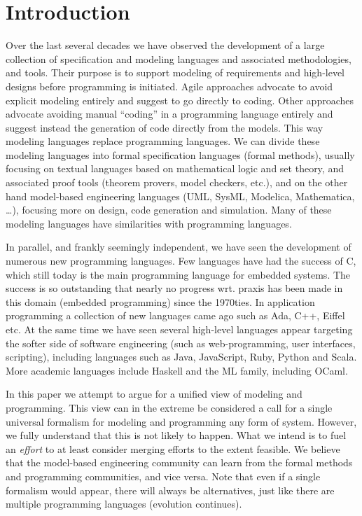 
\section{Introduction}

Over the last several decades we have observed the development of a 
large collection of specification and modeling languages and 
associated methodologies, and tools. Their purpose is to 
support modeling of requirements and high-level designs before 
programming is initiated. Agile approaches advocate to avoid 
explicit modeling entirely and suggest to go directly to coding. 
Other approaches advocate avoiding manual “coding” in a programming 
language entirely and suggest instead the generation of code 
directly from the models. This way modeling languages replace 
programming languages.  We can divide these modeling languages into 
formal specification languages (formal methods), usually focusing 
on textual languages based on mathematical logic and set theory, 
and associated proof tools (theorem provers, model checkers, etc.), 
and on the other hand model-based engineering languages (UML, 
SysML, Modelica, Mathematica, …), focusing more on design, code 
generation and simulation. Many of these modeling languages have 
similarities with programming languages.

In parallel, and frankly seemingly independent, we have seen the 
development of numerous new programming languages. Few languages 
have had the success of C, which still today is the main 
programming language for embedded systems. The success is so 
outstanding that nearly no progress wrt. praxis has been made in 
this domain (embedded programming) since the 1970ties.  In 
application programming a collection of new languages came ago such 
as Ada, C++, Eiffel etc. At the same time we have seen several 
high-level languages appear targeting the softer side of software 
engineering (such as web-programming, user interfaces, scripting), 
including languages such as Java, JavaScript, Ruby, Python and 
Scala.  More academic languages include Haskell and the ML family, 
including OCaml.

In this paper we attempt to argue for a unified view of modeling
and programming. This view can in the extreme be considered a call
for a single universal formalism for modeling and programming any
form of system. However, we fully understand that this is not likely
to happen. What we intend is to fuel an {\em effort} to at least consider
merging efforts to the extent feasible. We believe that the model-based
engineering community can learn from the formal methods and 
programming communities, and vice versa. Note that even if a single
formalism would appear, there will always be alternatives, just like
there are multiple programming languages (evolution continues). 

